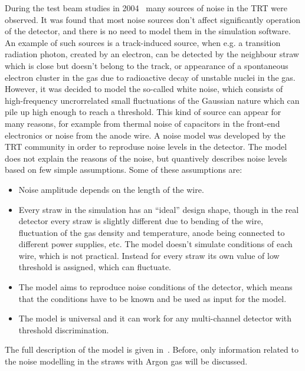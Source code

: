 During the test beam studies in 2004~\cite{trt_test_beam} many sources of noise in the TRT were observed.
It was found that most noise sources don't affect significantly operation of the detector, and there is no need to model them in the simulation software.
An example of such sources is a track-induced source, when e.g. a transition radiation photon, created by an electron, can be detected by the neighbour straw which is close 
but doesn't belong to the track, or appearance of a spontaneous electron cluster in the gas due to radioactive decay of unstable nuclei in the gas.
However, it was decided to model the so-called white noise, which consists of high-frequency uncrorrelated small fluctuations of the Gaussian nature which 
can pile up high enough to reach a threshold. This kind of source can appear for many reasons, for example from thermal noise of capacitors in the front-end electronics
or noise from the anode wire. A noise model was developed by the TRT community in order to reproduse noise levels in the detector.
The model does not explain the reasons of the noise, but quantively describes noise levels based on few simple assumptions.
Some of these assumptions are:
\begin{itemize}
 \item Noise amplitude depends on the length of the wire.
 \item Every straw in the simulation has an ``ideal'' design shape, though in the real detector every straw is slightly different due to bending of the wire, 
 fluctuation of the gas  density and temperature, anode being connected to different power supplies, etc. The model doesn't simulate conditions of each wire, 
 which is not practical. 
 Instead for every straw its own value of low threshold is assigned, which can fluctuate.
 \item The model aims to reproduce noise conditions of the detector, which means that the conditions have to be known and be used as input for the model.
 \item The model is universal and it can work for any multi-channel detector with threshold discrimination.
\end{itemize}
The full description of the model is given in~\cite{kittelmann_thesis}. 
Before, only information related to the noise modelling in the straws with Argon gas will be discussed.


